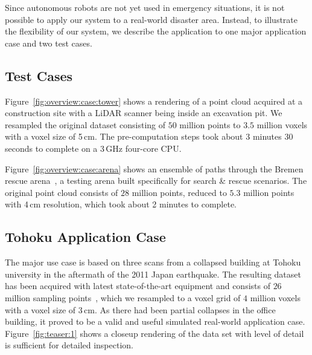 \documentclass{egpubl}
\begin{document}
Since autonomous robots are not yet used in emergency situations, it is not possible to apply our system to a real-world disaster area. Instead, to illustrate the flexibility of our system, we describe the application to one major application case and two test cases.

\subsection{Test Cases} \label{sec:results:testcases}
 Figure~\ref{fig:overview:case:tower} shows a rendering of a point cloud acquired at a construction site with a LiDAR scanner being inside an excavation pit. We resampled the original dataset consisting of $50$ million points to $3.5$ million voxels with a voxel size of 5\,cm. The pre-computation steps took about 3 minutes 30 seconds to complete on a 3\,GHz four-core CPU. 

 Figure~\ref{fig:overview:case:arena} shows an ensemble of paths through the Bremen rescue arena~\cite{varsadan08}, a testing arena built specifically for search \& rescue scenarios. The original point cloud consists of $28$ million points, reduced to $5.3$ million points with 4\,cm resolution, which took about 2 minutes to complete.

\subsection{Tohoku Application Case} \label{sec:results:applicationcase}

The major use case is based on three scans from a collapsed building at Tohoku university in the aftermath of the 2011 Japan earthquake. The resulting dataset has been acquired with latest state-of-the-art equipment and consists of $26$ million sampling points~\cite{journals/jfr/NagataniKOOYTNYKFK13}, which we resampled to a voxel grid of $4$ million voxels with a voxel size of 3\,cm. As there had been partial collapses in the office building, it proved to be a valid and useful simulated real-world application case. Figure~\ref{fig:teaser:1} shows a closeup rendering of the data set with level of detail is sufficient for detailed inspection.
\end{document}
